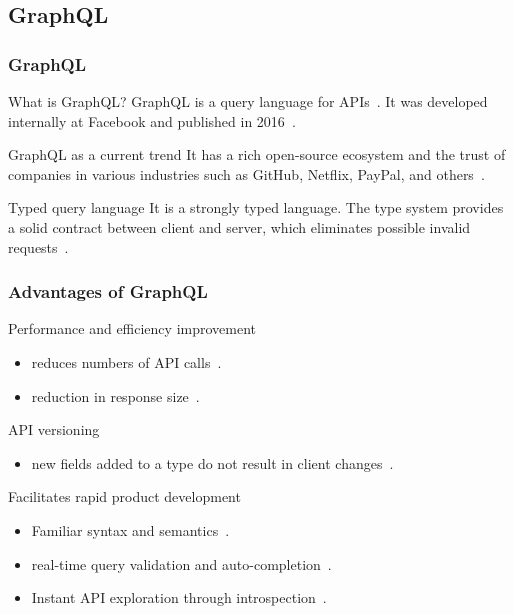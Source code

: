 \subsection{GraphQL}

\begin{frame}\frametitle{GraphQL}

  \begin{block}{What is GraphQL?}
    GraphQL is a query language for APIs~\cite{gql-spec}. It was developed internally at  Facebook and published in 2016~\cite{initial-analysis-of-gql}. 
  \end{block}

  \begin{block}{GraphQL as a current trend}
    It has a rich open-source ecosystem and the trust of companies in various industries such as GitHub, Netflix, PayPal, and others~\cite{morph-gql-1}.
  \end{block}

\begin{block}{Typed query language}
  It is a strongly typed language. The type system provides a solid contract between client and server, which eliminates possible invalid requests~\cite{real-time-sys-arc-based-on-gql}.
\end{block}

\end{frame}

\begin{frame}\frametitle{Advantages of GraphQL}

\begin{block}{Performance and efficiency improvement}
\begin{itemize}
  \item reduces numbers of API calls~\cite{migrating-to-gql}.
  \item reduction in response size~\cite{migrating-to-gql}.
\end{itemize}
\end{block}

\begin{block}{API versioning}
\begin{itemize}
  \item new fields added to a type do not result in client changes~\cite{migrating-to-gql}. 
\end{itemize}

\end{block}

\begin{block}{Facilitates rapid product development}
\begin{itemize}
  \item  Familiar syntax and semantics~\cite{rest-vs-gql-controlled-experiment}.
  \item real-time query validation and auto-completion~\cite{rest-vs-gql-controlled-experiment,migrating-to-gql}.
  \item Instant API exploration through introspection~\cite{migrating-to-gql}. 
\end{itemize}

\end{block}

\end{frame}

